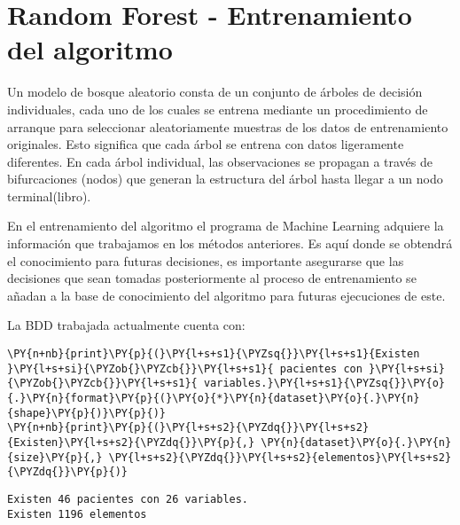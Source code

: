     \hypertarget{random-forest---entrenamiento-del-algoritmo}{%
\section{Random Forest - Entrenamiento del
algoritmo}\label{random-forest---entrenamiento-del-algoritmo}}

Un modelo de bosque aleatorio consta de un conjunto de árboles de
decisión individuales, cada uno de los cuales se entrena mediante un
procedimiento de arranque para seleccionar aleatoriamente muestras de
los datos de entrenamiento originales. Esto significa que cada árbol se
entrena con datos ligeramente diferentes. En cada árbol individual, las
observaciones se propagan a través de bifurcaciones (nodos) que generan
la estructura del árbol hasta llegar a un nodo terminal(libro).

En el entrenamiento del algoritmo el programa de Machine Learning
adquiere la información que trabajamos en los métodos anteriores. Es
aquí donde se obtendrá el conocimiento para futuras decisiones, es
importante asegurarse que las decisiones que sean tomadas posteriormente
al proceso de entrenamiento se añadan a la base de conocimiento del
algoritmo para futuras ejecuciones de este.

La BDD trabajada actualmente cuenta con:

    \begin{tcolorbox}[breakable, size=fbox, boxrule=1pt, pad at break*=1mm,colback=cellbackground, colframe=cellborder]
\begin{Verbatim}[commandchars=\\\{\}]
\PY{n+nb}{print}\PY{p}{(}\PY{l+s+s1}{\PYZsq{}}\PY{l+s+s1}{Existen }\PY{l+s+si}{\PYZob{}\PYZcb{}}\PY{l+s+s1}{ pacientes con }\PY{l+s+si}{\PYZob{}\PYZcb{}}\PY{l+s+s1}{ variables.}\PY{l+s+s1}{\PYZsq{}}\PY{o}{.}\PY{n}{format}\PY{p}{(}\PY{o}{*}\PY{n}{dataset}\PY{o}{.}\PY{n}{shape}\PY{p}{)}\PY{p}{)}
\PY{n+nb}{print}\PY{p}{(}\PY{l+s+s2}{\PYZdq{}}\PY{l+s+s2}{Existen}\PY{l+s+s2}{\PYZdq{}}\PY{p}{,} \PY{n}{dataset}\PY{o}{.}\PY{n}{size}\PY{p}{,} \PY{l+s+s2}{\PYZdq{}}\PY{l+s+s2}{elementos}\PY{l+s+s2}{\PYZdq{}}\PY{p}{)}
\end{Verbatim}
\end{tcolorbox}

    \begin{Verbatim}[commandchars=\\\{\}]
Existen 46 pacientes con 26 variables.
Existen 1196 elementos
    \end{Verbatim}

